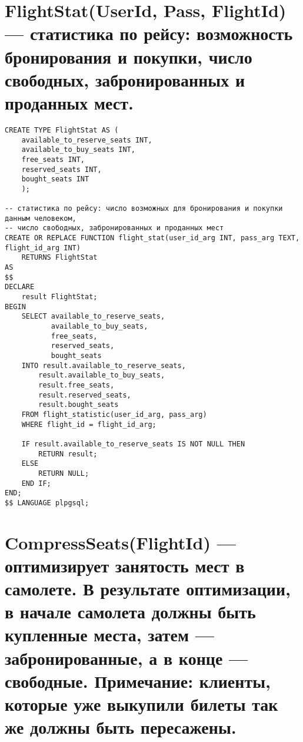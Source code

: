 \documentclass{article}
\begin{document}
\section{FlightStat(UserId, Pass, FlightId) — статистика по рейсу: возможность бронирования и покупки, число свободных, забронированных и проданных мест.}

\begin{verbatim}
CREATE TYPE FlightStat AS (
    available_to_reserve_seats INT,
    available_to_buy_seats INT,
    free_seats INT,
    reserved_seats INT,
    bought_seats INT
    );

-- статистика по рейсу: число возможных для бронирования и покупки данным человеком,
-- число свободных, забронированных и проданных мест
CREATE OR REPLACE FUNCTION flight_stat(user_id_arg INT, pass_arg TEXT, flight_id_arg INT)
    RETURNS FlightStat
AS
$$
DECLARE
    result FlightStat;
BEGIN
    SELECT available_to_reserve_seats,
           available_to_buy_seats,
           free_seats,
           reserved_seats,
           bought_seats
    INTO result.available_to_reserve_seats,
        result.available_to_buy_seats,
        result.free_seats,
        result.reserved_seats,
        result.bought_seats
    FROM flight_statistic(user_id_arg, pass_arg)
    WHERE flight_id = flight_id_arg;

    IF result.available_to_reserve_seats IS NOT NULL THEN
        RETURN result;
    ELSE
        RETURN NULL;
    END IF;
END;
$$ LANGUAGE plpgsql;
\end{verbatim}

\section{CompressSeats(FlightId) — оптимизирует занятость мест в самолете. В результате оптимизации, в начале самолета должны быть купленные места, затем — забронированные, а в конце — свободные. Примечание: клиенты, которые уже выкупили билеты так же должны быть пересажены.}
\end{document}
